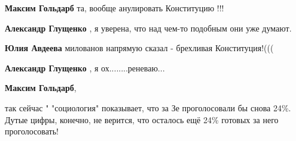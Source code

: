 \begin{itemize}
\begin{itemize} %
\textbf{Максим Гольдарб} та, вообще анулировать Конституцию !!!

\textbf{Александр Глущенко} , я уверена, что над чем-то подобным они уже думают.

\textbf{Юлия Авдеева} милованов напрямую сказал - брехливая Конституция!(((

\textbf{Александр Глущенко} , я ох........реневаю...
\end{itemize} %

\textbf{Максим Гольдарб}, 

так сейчас " "социология" показывает, что за Зе проголосовали бы снова 24\%.
Дутые цифры, конечно, не верится, что осталось ещё 24\% готовых за него
проголосовать!


\end{itemize} %
